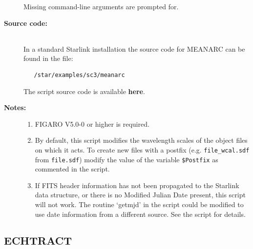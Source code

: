 \documentclass[twoside,11pt]{article}
\newcommand{\stardocinitials}  {SC}
\newcommand{\stardocnumber}    {3.2-0} %
\newcommand{\stardocname}{\stardocinitials /\stardocnumber}
\newcommand{\htmlref}[2]{#1}
\newenvironment{latexonly}{}{}
\newcommand{\xlabel}[1]{}
\renewcommand{\_}{\texttt{\symbol{95}}}
\begin{document}
\begin{description}
\begin{enumerate}
\end{enumerate}

     Missing command-line arguments are prompted for.

\item [{\bf Source code:}] \mbox{} \\
\begin{latexonly}
In a standard Starlink installation the source code for MEANARC can be found
in the file:
\begin{verbatim}
   /star/examples/sc3/meanarc
\end{verbatim}
\end{latexonly}
\begin{htmlonly}
      The script source code is available
      \htmlref{{\bf here}}{se_meanarc_source}.
\end{htmlonly}

\newpage
\item [{\bf Notes:}] \mbox{}
\begin{enumerate}

\item FIGARO V5.0-0 or higher is required.

\item By default, this script modifies the wavelength scales of the
      object files on which it acts.  To create new files with a
      postfix (e.g. \verb+file_wcal.sdf+ from \verb+file.sdf+) modify the
      value of the variable \verb+$Postfix+ as commented in the
      script.  %

\item If FITS header information has not been propagated to the
      Starlink data structure, or there is no Modified Julian Date
      present, this script will not work.  The routine `getmjd' in
      the script could be modified to use date information from a
      different source.  See the script for details.

\end{enumerate}

\end{description}

\newpage
\subsection{\label{se_echtract}\xlabel{ECHTRACT}ECHTRACT}
\markboth{ECHTRACT}{\stardocname}
\end{document}
